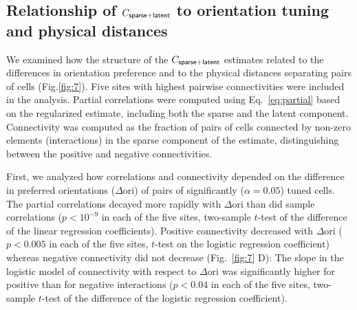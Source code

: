 \subsection*{Relationship of $C_{\sf sparse+latent}$ to orientation tuning and physical distances}

We examined how the structure of the $C_{\sf sparse+latent}$ estimates related to the differences in orientation preference and to the physical distances separating pairs of cells (Fig.\;\ref{fig:7}).  Five sites with highest pairwise connectivities were included in the analysis. Partial correlations were computed using Eq.~\ref{eq:partial} based on the regularized estimate, including both the sparse and the latent component. Connectivity was computed as the fraction of pairs of cells connected by non-zero elements (interactions) in the sparse component of the estimate, distinguishing between the positive and negative connectivities.

First, we analyzed how correlations and connectivity depended on the difference in preferred orientations ($\Delta \mbox{ori}$) of pairs of significantly ($\alpha=0.05$) tuned cells. The partial correlations decayed more rapidly with $\Delta\mbox{ori}$ than did sample correlations ($p<10^{-9}$ in each of the five sites, two-sample $t$-test of the difference of the linear regression coefficients). Positive connectivity decreased with $\Delta\mbox{ori}$ ($p<0.005$ in each of the five sites, $t$-test on the logistic regression coefficient) whereas negative connectivity did not decrease (Fig.~\ref{fig:7} D): The slope in the logistic model of connectivity with respect to $\Delta\mbox{ori}$ was significantly higher for positive than for negative interactions ($p<0.04$ in each of the five sites, two-sample $t$-test of the difference of the logistic regression coefficient).

